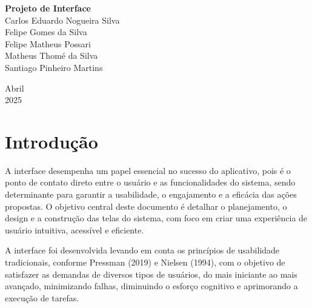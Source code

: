 \documentclass[a5paper, 12pt]{article}
\begin{document}
\begin{titlepage}
	\begin{center}
	
	\begin{figure}[!ht]
	\centering
    \end{figure}

	\vspace{115pt}
    \textbf{\Huge{Projeto de Interface}}\\
        
	\vspace{115pt}
    Carlos Eduardo Nogueira Silva \\
    Felipe Gomes da Silva \\
    Felipe Matheus Possari \\
    Matheus Thomé da Silva\\ 
    Santiago Pinheiro Martins \\
	\end{center}
	
	\vspace{1cm}
	\begin{center}
		\vspace{\fill}
		Abril \\
		2025
	\end{center}
\end{titlepage}

\newpage
\thispagestyle{empty}
\tableofcontents

\newpage
\pagestyle{fancy}
\fancyhead[L]{\thepage}
\fancyhead[C]{\nouppercase{\leftmark}}
\fancyfoot[R]{}
\fancyfoot[L]{}
\setlength\headheight{26pt}

\section{Introdução}
A interface desempenha um papel essencial no sucesso do aplicativo, pois é o ponto de contato direto entre o usuário e as funcionalidades do sistema, sendo determinante para garantir a usabilidade, o engajamento e a eficácia das ações propostas. O objetivo central deste documento é detalhar o planejamento, o design e a construção das telas do sistema, com foco em criar uma experiência de usuário intuitiva, acessível e eficiente.

 A interface foi desenvolvida levando em conta os princípios de usabilidade tradicionais, conforme Pressman (2019) e Nielsen (1994), com o objetivo de satisfazer as demandas de diversos tipos de usuários, do mais iniciante ao mais avançado, minimizando falhas, diminuindo o esforço cognitivo e aprimorando a execução de tarefas. 
 
\end{document}
